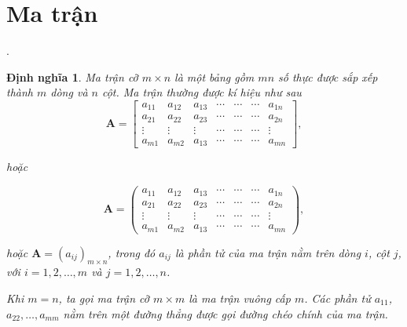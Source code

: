 \documentclass[12pt,a4paper,oneside]{report}
\newtheorem{dn}{Định nghĩa}[section]
\numberwithin{equation}{section}
\begin{document}
\section{Ma trận}.
\begin{dn}\rm                    %
 Ma trận cỡ $m \times n$ là một bảng gồm $m n$ số thực được sắp xếp thành $m$ dòng và $n$ cột. Ma trận thường được kí hiệu như sau\\
 $$
 \mathbf{A}=\left[\begin{array}{ccccccc}
 	a_{11} & a_{12} & a_{13} & \cdots & \cdots & \cdots & a_{1 n} \\
 	a_{21} & a_{22} & a_{23} & \cdots & \cdots & \cdots & a_{2 n} \\
 	\vdots & \vdots & \vdots & \cdots & \cdots & \cdots & \vdots \\
 	a_{m 1} & a_{m 2} & a_{13} & \cdots & \cdots & \cdots & a_{m n}
 \end{array}\right],
 $$
 
 hoặc
 
 $$
 \mathbf{A}=\left(\begin{array}{ccccccc}
 	a_{11} & a_{12} & a_{13} & \cdots & \cdots & \cdots & a_{1 n} \\
 	a_{21} & a_{22} & a_{23} & \cdots & \cdots & \cdots & a_{2 n} \\
 	\vdots & \vdots & \vdots & \cdots & \cdots & \cdots & \vdots \\
 	a_{m 1} & a_{m 2} & a_{13} & \cdots & \cdots & \cdots & a_{m n}
 \end{array}\right),
 $$
 
 hoặc $\mathbf{A}=\left(a_{i j}\right)_{m \times n}$, trong đó $a_{i j}$ là phần tử của ma trận nằm trên dòng $i$, cột $j$, với $i=1,2, \ldots, m$ và $j=1,2, \ldots, n$.
 
 Khi $m=n$, ta gọi ma trận cỡ $m \times m$ là ma trận vuông cấp $m$. Các phần tử $a_{11}$, $a_{22}, \ldots, a_{m m}$ nằm trên một đường thẳng được gọi đường chéo chính của ma trận.
\end{dn}
	
\end{document}

